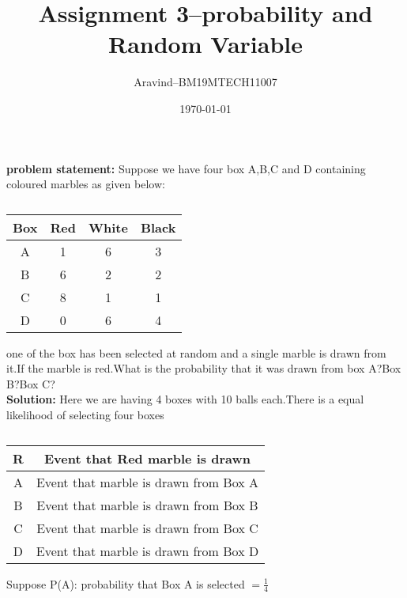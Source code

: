 \documentclass[11pt,a4paper,twocolumn]{article}
\title{\textbf{Assignment 3--probability and Random Variable}}
\author{Aravind--BM19MTECH11007}
\date{\today}
\begin{document}
\maketitle
\textbf{problem statement:} Suppose we have four box A,B,C and D containing coloured marbles as given below:
\begin{table}[h]
\centering
\caption{}

\begin{tabular}{|c|c|c|c|}
\hline
Box & Red & White & Black\\
\hline
A & 1&6&3\\
B&6&2&2\\
C&8&1&1\\
D&0&6&4\\
\hline
\end{tabular}
\end{table}
one of the box has been selected at random and a single marble is drawn from it.If the marble is red.What is the probability that it was drawn from box A?Box B?Box C?
\\
\textbf{Solution:}
Here we are having 4 boxes with 10 balls each.There is a equal likelihood of selecting  four boxes
\\
\begin{table}[h]
\centering
\caption{}
\begin{tabular}{|c|c|}
\hline
R&Event that Red marble is drawn\\
\hline
A&Event that marble is drawn from Box A\\
\hline
B&Event that marble is drawn from Box B\\
\hline
C&Event that marble is drawn from Box C\\
\hline
D&Event that marble is drawn from Box D\\
\hline
\end{tabular}
\end{table}
Suppose
P(A): probability that  Box A is selected  $=\frac{1}{
4}$
\end{document}
